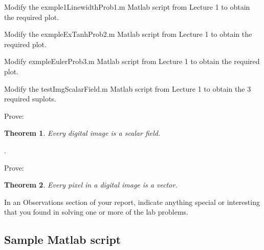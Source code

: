 \documentclass{amsart}
\newtheorem{theorem}{Theorem}
\begin{document}
\begin{compactenum}
 \item Modify the exmple1LinewidthProb1.m Matlab script from Lecture 1 to obtain the required plot.

    
\item Modify the exmpleExTanhProb2.m Matlab script from Lecture 1 to obtain the required plot.
\item Modify exmpleEulerProb3.m Matlab script from Lecture 1 to obtain the required plot.
\item Modify the testImgScalarField.m Matlab script from Lecture 1 to obtain the 3 required suplots.
\item Prove:\\
	\begin{theorem} Every digital image is a scalar field.
	\end{theorem}.
\item Prove:\\
	\begin{theorem} Every pixel in a digital image is a vector.
	\end{theorem}
\item In an Observations section of your report,
indicate anything special or interesting that you found in solving one or more of the lab problems.
\end{compactenum}

\begin{appendix}
\section{Sample Matlab script}


\end{appendix}

%
%
\end{document}
